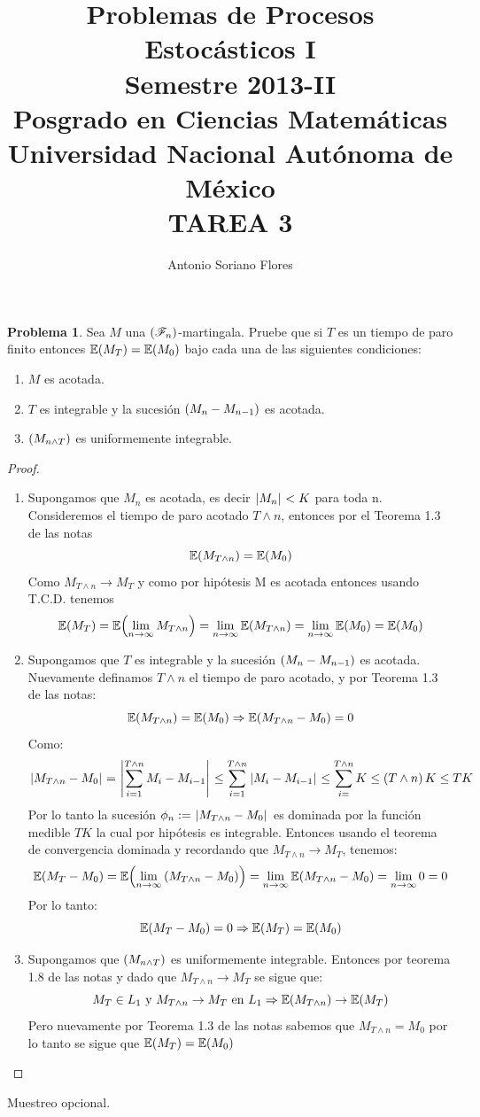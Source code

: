\documentclass[a5paper,oneside]{amsart}
\title[Problemas de Procesos I]{Problemas de Procesos Estoc\'asticos I\\ Semestre 2013-II\\ Posgrado en Ciencias Matem\'aticas\\ Universidad Nacional Aut\'onoma de M\'exico\\TAREA 3}
\author{Antonio Soriano Flores}
\theoremstyle{plain}
\theoremstyle{definition}
\newtheorem{problema}{Problema}
\begin{document}
\maketitle




\begin{problema}
Sea $M$ una $\left( \mathscr{F}_n\right) $-martingala. Pruebe que si $T$ es un tiempo de paro finito entonces $\mathbb{E}\! \left( M_T \right)=\mathbb{E}\! \left( M_0 \right)$ bajo cada una de las siguientes condiciones:
\begin{enumerate}
\item $M$ es acotada.
\item $T$ es integrable y la sucesi\'on $\left( M_n-M_{n-1}\right) $ es acotada.
\item $\left( M_{n\wedge T}\right) $ es uniformemente integrable. 
\end{enumerate}
\begin{proof}
\begin{enumerate}
	\item Supongamos que $M_n$ es acotada, es decir $\hspace{.25mm}\left|M_n\right|\hspace{.25mm}< K$ para toda n.
	Consideremos el tiempo de paro acotado $T \wedge n$, entonces por el Teorema 1.3 de las notas  
	$$
	\mathbb{E}\! \left( M_{T \wedge n} \right)=\mathbb{E}\! \left( M_0 \right)
	$$
	Como $M_{T \wedge n} \rightarrow M_T$ y como por hip\'otesis M es acotada entonces usando T.C.D. tenemos
	$$
	\mathbb{E}\! \left( M_T \right)=\mathbb{E}\! \left( \lim_{n \rightarrow \infty}M_{T \wedge n} \right)=\lim_{n \rightarrow \infty}\mathbb{E}\! \left( M_{T \wedge n} \right)=\lim_{n \rightarrow \infty}\mathbb{E}\! \left( M_0 \right)=\mathbb{E}\! \left( M_0 \right)
	$$
	\item Supongamos que $T$ es integrable y la sucesi\'on $\left( M_n-M_{n-1}\right) $ es acotada. Nuevamente definamos $T \wedge n$ el tiempo de paro acotado, y por Teorema 		1.3 de las notas:
	$$
	\mathbb{E}\! \left( M_{T \wedge n} \right)=\mathbb{E}\! \left( M_0 \right) \Rightarrow \mathbb{E}\! \left( M_{T \wedge n}-M_0 \right)=0 
	$$
	Como:
	$$
	\hspace{.25mm}\left|M_{T\wedge n}-M_0\right|\hspace{.25mm}=\hspace{.25mm}\left|\sum_{i=1}^{T\wedge n}M_i-M_{i-1}\right|\hspace{.25mm}\leq \sum_{i=1}^{T\wedge n}\hspace{.25mm}\left|M_i-M_{i-1}\right|\hspace{.25mm}\leq \sum_{i=}^{T\wedge n} K \leq \left( T\wedge n\right) K\leq TK
	$$
	Por lo tanto la sucesi\'on $\phi_n:=\hspace{.25mm}\left|M_{T\wedge n}-M_0\right|\hspace{.25mm}$ es dominada por la funci\'on medible   $TK$  la cual por hip\'otesis es integrable. Entonces usando el teorema de convergencia dominada y recordando que  $M_{T \wedge n} \rightarrow M_T$, tenemos:
	$$
	\mathbb{E}\! \left( M_T-M_0 \right)=\mathbb{E}\! \left( \lim_{n \rightarrow \infty} \left( M_{T\wedge n}-M_0\right)   \right)=\lim_{n \rightarrow \infty}\mathbb{E}\! \left( M_{T\wedge n}-M_0  \right)=\lim_{n \rightarrow \infty}0=0 
	$$
	Por lo tanto:
	$$
	\mathbb{E}\! \left( M_T-M_0 \right)=0 \Rightarrow \mathbb{E}\! \left( M_T \right)=\mathbb{E}\! \left( M_0 \right)
	$$
	\item Supongamos que $\left( M_{n\wedge T}\right) $ es uniformemente integrable. Entonces por teorema 1.8 de las notas  y dado que $M_{T \wedge n} \rightarrow M_T$ se sigue que:
	$$
	M_T \in L_1 \text{ y } M_{T \wedge n} \rightarrow M_T \text { en $L_1$} \Rightarrow \mathbb{E}\! \left( M_{T \wedge n} \right) \rightarrow \mathbb{E}\! \left( M_T \right)	
	$$
	Pero nuevamente por Teorema 1.3 de las notas sabemos que $M_{T \wedge n}=M_0$ por lo tanto se sigue que $\mathbb{E}\! \left( M_T \right)=\mathbb{E}\! \left( M_0 \right)$
 
	
	
\end{enumerate}
\end{proof}
 Muestreo opcional. 
\end{problema}
\end{document}
